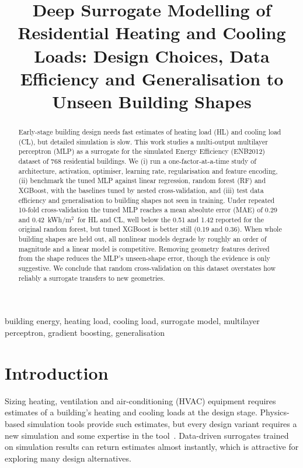 \documentclass[conference]{IEEEtran}
\begin{document}
\title{Deep Surrogate Modelling of Residential Heating and Cooling Loads: Design Choices, Data Efficiency and Generalisation to Unseen Building Shapes}

\author{
}

\maketitle

\begin{abstract}
Early-stage building design needs fast estimates of heating load (HL) and cooling load (CL), but detailed simulation is slow. This work studies a multi-output multilayer perceptron (MLP) as a surrogate for the simulated Energy Efficiency (ENB2012) dataset of 768 residential buildings. We (i) run a one-factor-at-a-time study of architecture, activation, optimiser, learning rate, regularisation and feature encoding, (ii) benchmark the tuned MLP against linear regression, random forest (RF) and XGBoost, with the baselines tuned by nested cross-validation, and (iii) test data efficiency and generalisation to building shapes not seen in training. Under repeated 10-fold cross-validation the tuned MLP reaches a mean absolute error (MAE) of 0.29 and 0.42~kWh/m$^2$~for HL and CL, well below the 0.51 and 1.42 reported for the original random forest, but tuned XGBoost is better still (0.19 and 0.36). When whole building shapes are held out, all nonlinear models degrade by roughly an order of magnitude and a linear model is competitive. Removing geometry features derived from the shape reduces the MLP's unseen-shape error, though the evidence is only suggestive. We conclude that random cross-validation on this dataset overstates how reliably a surrogate transfers to new geometries.
\end{abstract}

\begin{IEEEkeywords}
building energy, heating load, cooling load, surrogate model, multilayer perceptron, gradient boosting, generalisation
\end{IEEEkeywords}

\section{Introduction}
Sizing heating, ventilation and air-conditioning (HVAC) equipment requires estimates of a building's heating and cooling loads at the design stage. Physics-based simulation tools provide such estimates, but every design variant requires a new simulation and some expertise in the tool~\cite{tsanas}. Data-driven surrogates trained on simulation results can return estimates almost instantly, which is attractive for exploring many design alternatives.
\end{document}
